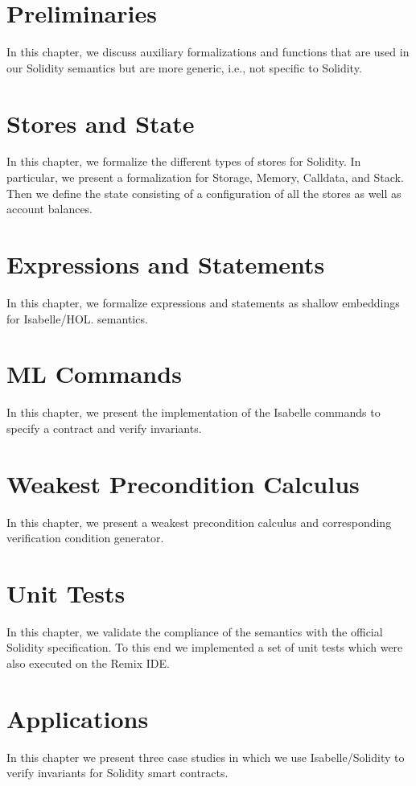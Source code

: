 \documentclass[10pt,DIV17,a4paper,abstract=true,twoside=semi,openright]
{scrreprt}
\begin{document}
\clearpage

\chapter{Preliminaries}
In this chapter, we discuss auxiliary formalizations and functions that
are used in our Solidity semantics but are more generic, i.e., not
specific to Solidity.




\chapter{Stores and State}
In this chapter, we formalize the different types of stores for Solidity.
In particular, we present a formalization for Storage, Memory, Calldata, and Stack.
Then we define the state consisting of a configuration of all the stores as well as account balances.



\chapter{Expressions and Statements}

In this chapter, we formalize expressions and statements as shallow embeddings for Isabelle/HOL.
semantics. 



\chapter{ML Commands}
In this chapter, we present the implementation of the Isabelle commands to specify
a contract and verify invariants.



\chapter{Weakest Precondition Calculus}
In this chapter, we present a weakest precondition calculus and corresponding
verification condition generator.



\chapter{Unit Tests}

In this chapter, we validate the compliance of the semantics with the official Solidity specification.
To this end we implemented a set of unit tests which were also executed on the Remix IDE.



\chapter{Applications}

In this chapter we present three case studies in which we use Isabelle/Solidity to verify
invariants for Solidity smart contracts.







%    
\end{document}
